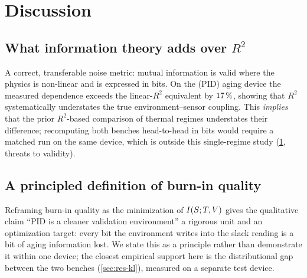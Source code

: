 \section{Discussion}
\label{sec:discussion}


\subsection{What information theory adds over $R^2$}
A correct, transferable noise metric: mutual information is valid where the
physics is non-linear and is expressed in bits. On the (PID) aging device the
measured dependence exceeds the linear-$R^2$ equivalent by $17\,\%$,
showing that $R^2$ systematically understates the true environment--sensor
coupling. This \emph{implies} that the prior $R^2$-based comparison of thermal
regimes understates their difference; recomputing both benches head-to-head in
bits would require a matched run on the same device, which is outside this
single-regime study (\cref{sec:discussion}, threats to validity).

\subsection{A principled definition of burn-in quality}
Reframing burn-in quality as the minimization of $I\!\left(S ; T,V\right)$ gives
the qualitative claim ``PID is a cleaner validation environment'' a rigorous unit
and an optimization target: every bit the environment writes into the slack
reading is a bit of aging information lost. We state this as a principle rather
than demonstrate it within one device; the closest empirical support here is the
distributional gap between the two benches (\cref{sec:res-kl}), measured on a
separate test device.

